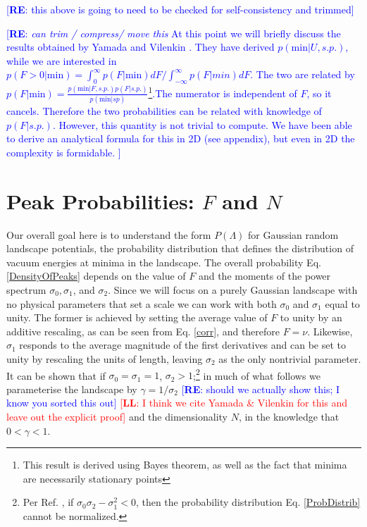 \documentclass[12pt]{article}
\newcommand{\re}[1]{\textcolor{blue}{[{\bf RE}: #1]}}
\newcommand{\lfl}[1]{\textcolor{red}{[{\bf LL}: #1]}}
\begin{document}
\re{this above is going to need to be checked for self-consistency and trimmed}

\re{{\it can trim / compress/ move this} At this point we will briefly discuss the results obtained by Yamada and Vilenkin \cite{Yamada2018}. They have derived $p(\mathrm{min}|U, s.p.)$, while we are interested in $p(F>0|\mathrm{min})=\int^\infty_0 p(F|\mathrm{min})dF/\int^\infty_{-\infty} p(F|min)dF$. The two are related by $p(F|\mathrm{min})= \frac{p(\mathrm{min}|F, s.p.)p(F|s.p.)}{p(\mathrm{min}|sp)}$\footnote{This result is derived using Bayes theorem, as well as the fact that minima are necessarily stationary points}.The numerator is independent of $F$, so it cancels. Therefore the two probabilities can be related with knowledge of $p(F|s.p.)$. However, this quantity is not trivial to compute. We have been able to derive an analytical formula for this in 2D (see appendix), but even in 2D the complexity is formidable. }



\section{Peak Probabilities: $F$ and $N$} \label{PeakNumbers}

Our overall goal here is to understand the form $P(\Lambda)$ for  Gaussian random landscape potentials, the probability distribution that defines the distribution of vacuum energies at minima in the landscape. The overall probability Eq. \ref{DensityOfPeaks} depends on the value of $F$ and the moments of the power spectrum $\sigma_0, \sigma_1$,  and $\sigma_2$.  Since we will focus on a purely Gaussian landscape with no  physical parameters that set a scale we can work with both $\sigma_0$ and $\sigma_1$ equal to unity. The former is achieved by setting the average value of $F$ to unity by an additive rescaling, as can be seen from  Eq. \ref{corr}, and therefore $F = \nu$. Likewise, $\sigma_1$ responds to the average magnitude of the first derivatives and can be set to unity by rescaling the units of length, leaving $\sigma_2$ as the only nontrivial parameter. It can be shown that if $\sigma_0=\sigma_1=1$, $\sigma_2>1$;\footnote{Per Ref. \cite{Yamada2018}, if $\sigma_0\sigma_2 - \sigma_1^2 < 0$, then the probability distribution Eq. \ref{ProbDistrib} cannot be normalized.} in much of what follows we  parameterise the landscape by $\gamma = 1/\sigma_2$ \re{should we actually show this; I know you sorted this out} \lfl{I think we cite Yamada \& Vilenkin for this and leave out the explicit proof} and the dimensionality $N$,  in the knowledge that $0<\gamma<1$.
\end{document}
